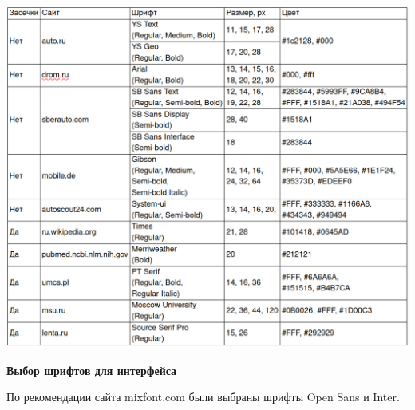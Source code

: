\noindent
\begin{minipage}{\linewidth}
    \includegraphics[width=\linewidth]{table}
\end{minipage}
\bigskip

\textbf{Выбор шрифтов для интерфейса}

По рекомендации сайта mixfont.com были выбраны шрифты Open Sans и Inter.
\bigskip

\noindent
\begin{minipage}{\linewidth}
\end{minipage}
\bigskip

\noindent
\begin{minipage}{\linewidth}
\end{minipage}
\bigskip

